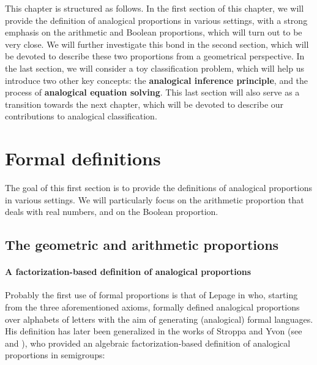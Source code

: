 This chapter is structured as follows. In the first section of this chapter, we
will provide the definition of analogical proportions in various settings, with
a strong emphasis on the arithmetic and Boolean proportions, which will turn
out to be very close. We will further investigate this bond in the second
section, which will be devoted to describe these two proportions from a
geometrical perspective. In the last section, we will consider a toy
classification problem, which will help us introduce two other key concepts:
the \textbf{analogical inference principle}, and the process of
\textbf{analogical equation solving}. This last section will also serve as a
transition towards the next chapter, which will be devoted to describe our
contributions to analogical classification.

\section{Formal definitions}
\label{SEC:formal_definitions_proportions}

The goal of this first section is to provide the definitions of analogical
proportions in various settings. We will particularly focus on the arithmetic
proportion that deals with real numbers, and on the Boolean proportion.

\subsection{The geometric and arithmetic proportions}

\paragraph{A factorization-based definition of analogical proportions\\}

Probably the first use of formal proportions is that of Lepage in \cite{Lep04}
who, starting from the three aforementioned axioms, formally defined analogical
proportions over alphabets of letters with the aim of generating (analogical)
formal languages. His definition has later been generalized in the works of
Stroppa and Yvon (see \cite{StrYvoCNLL05} and \cite{StrYvoREPORT05}), who
provided an algebraic factorization-based definition of analogical proportions
in semigroups:

